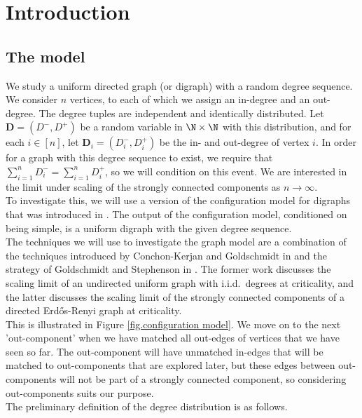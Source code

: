 \section{Introduction}
\subsection{The model}
We study a uniform directed graph (or digraph) with a random degree sequence. We consider $n$ vertices, to each of which we assign an in-degree and an out-degree. The degree tuples are independent and identically distributed. Let $\mathbf{D}=(D^-,D^+)$ be a random variable in $\N\times \N$ with this distribution, and for each $i\in [n]$, let $\mathbf{D}_i=(D^-_i,D^+_i)$  be the in- and out-degree of vertex $i$. In order for a graph with this degree sequence to exist, we require that $\sum_{i=1}^n D^-_i=\sum_{i=1}^n D^+_i$, so we will condition on this event. We are interested in the limit under scaling of the strongly connected components as $n\to \infty$.  \\
To investigate this, we will use a version of the configuration model for digraphs that was introduced in \cite{cooperSizeLargestStrongly2004}. The output of the configuration model, conditioned on being simple, is a uniform digraph with the given degree sequence. \\
The techniques we will use to investigate the graph model are a combination of the techniques introduced by Conchon-Kerjan and Goldschmidt in \cite{conchon--kerjanStableGraphMetric2020} and the strategy of Goldschmidt and Stephenson in \cite{goldschmidtScalingLimitCritical2019}. The former work discusses the scaling limit of an undirected uniform graph with i.i.d.\ degrees at criticality, and the latter discusses the scaling limit of the strongly connected components of a directed Erd\H{o}s-Renyi graph at criticality.\\
 This is illustrated in Figure \ref{fig.configuration model}. We move on to the next 'out-component' when we have matched all out-edges of vertices that we have seen so far. The out-component will have unmatched in-edges that will be matched to out-components that are explored later, but these edges between out-components will not be part of a strongly connected component, so considering out-components suits our purpose. \\
The preliminary definition of the degree distribution is as follows. 
